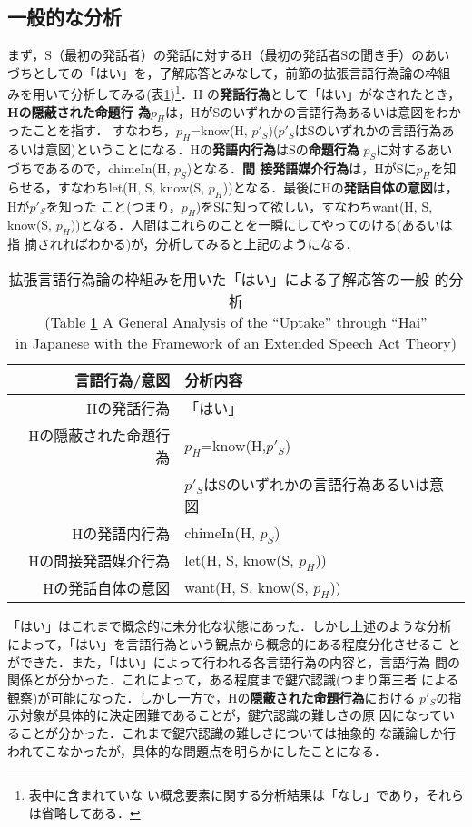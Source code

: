 \subsection{一般的な分析}
\label{yesspeechact}

まず，S（最初の発話者）の発話に対するH（最初の発話者Sの聞き手）のあい
づちとしての「はい」を，了解応答とみなして，前節の拡張言語行為論の枠組
みを用いて分析してみる(表\ref{yesspeech})\footnote{表中に含まれていな
い概念要素に関する分析結果は「なし」であり，それらは省略してある．}．H
の{\bf 発話行為}として「はい」がなされたとき，{\bf Hの隠蔽された命題行
為}$p_{H}$は，HがSのいずれかの言語行為あるいは意図をわかったことを指す．
すなわち，$p_{H}$=know(H, $p'_{S}$)($p'_{S}$はSのいずれかの言語行為あ
るいは意図)ということになる．Hの{\bf 発語内行為}はSの{\bf 命題行為}
$p_{S}$に対するあいづちであるので，chimeIn(H, $p_{S}$)となる．{\bf 間
接発語媒介行為}は，HがSに$p_{H}$を知らせる，すなわちlet(H, S, know(S,
$p_{H}$))となる．最後にHの{\bf 発話自体の意図}は，Hが$p'_{S}$を知った
こと(つまり，$p_{H}$)をSに知って欲しい，すなわちwant(H, S, know(S,
$p_{H}$))となる．人間はこれらのことを一瞬にしてやってのける(あるいは指
摘されればわかる)が，分析してみると上記のようになる．

\begin{table}[htbp]
\begin{center}
\begin{tabular}{r|l}
言語行為/意図 & 分析内容\\	\hline\hline
Hの発話行為 & 「はい」\\	\hline
Hの隠蔽された命題行為 & $p_{H}$=know(H,$p'_{S}$)\\
& $p'_{S}$はSのいずれかの言語行為あるいは意図\\	\hline
Hの発語内行為 & chimeIn(H, $p_{S}$)\\	\hline
Hの間接発語媒介行為 & let(H, S, know(S, $p_{H}$))\\	\hline
Hの発話自体の意図 & want(H, S, know(S, $p_{H}$))\\
\end{tabular}
\caption{拡張言語行為論の枠組みを用いた「はい」による了解応答の一般
的分析 \\
(Table \ref{yesspeech} A General Analysis of the ``Uptake''
through ``Hai'' \\
in Japanese with the Framework of an Extended Speech
Act Theory)}
\label{yesspeech}
\end{center}
\end{table}

「はい」はこれまで概念的に未分化な状態にあった．しかし上述のような分析
によって，「はい」を言語行為という観点から概念的にある程度分化させるこ
とができた．また，「はい」によって行われる各言語行為の内容と，言語行為
間の関係とが分かった．これによって，ある程度まで鍵穴認識(つまり第三者
による観察)が可能になった．しかし一方で，Hの{\bf 隠蔽された命題行為}における
$p'_{S}$の指示対象が具体的に決定困難であることが，鍵穴認識の難しさの原
因になっていることが分かった．これまで鍵穴認識の難しさについては抽象的
な議論しか行われてこなかったが，具体的な問題点を明らかにしたことになる．


